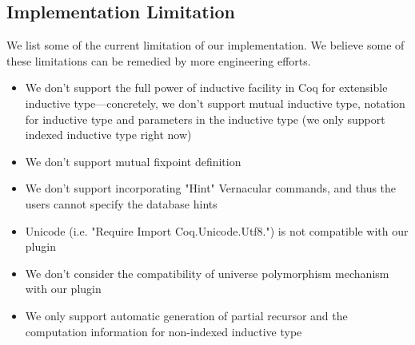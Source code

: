 \subsection{Implementation Limitation}
We list some of the current limitation of our implementation. We believe some of these limitations can be remedied by more engineering efforts.
\begin{itemize}
  \item We don't support the full power of inductive facility in Coq for extensible inductive type---concretely, we don't support mutual inductive type, notation for inductive type and parameters in the inductive type (we only support indexed inductive type right now)
  \item We don't support mutual fixpoint definition
  \item We don't support incorporating "Hint" Vernacular commands, and thus the users cannot specify the database hints
  \item Unicode (i.e. "Require Import Coq.Unicode.Utf8.") is not compatible with our plugin 
  \item We don't consider the compatibility of universe polymorphism mechanism with our plugin
  \item We only support automatic generation of partial recursor and the computation information for non-indexed inductive type 
\end{itemize}